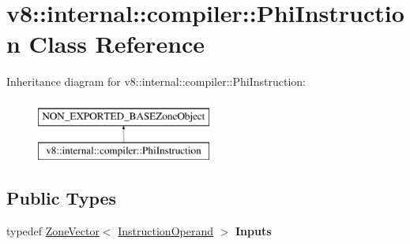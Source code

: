 \hypertarget{classv8_1_1internal_1_1compiler_1_1PhiInstruction}{}\section{v8\+:\+:internal\+:\+:compiler\+:\+:Phi\+Instruction Class Reference}
\label{classv8_1_1internal_1_1compiler_1_1PhiInstruction}
Inheritance diagram for v8\+:\+:internal\+:\+:compiler\+:\+:Phi\+Instruction\+:\begin{figure}[H]
\begin{center}
\leavevmode
\includegraphics[height=2.000000cm]{classv8_1_1internal_1_1compiler_1_1PhiInstruction}
\end{center}
\end{figure}
\subsection*{Public Types}
\begin{DoxyCompactItemize}
\item 
\mbox{\label{classv8_1_1internal_1_1compiler_1_1PhiInstruction_ab3e2fb4170336928ff7ba714359e7856}} 
typedef \mbox{\hyperlink{classv8_1_1internal_1_1ZoneVector}{Zone\+Vector}}$<$ \mbox{\hyperlink{classv8_1_1internal_1_1compiler_1_1InstructionOperand}{Instruction\+Operand}} $>$ {\bfseries Inputs}
\end{DoxyCompactItemize}
